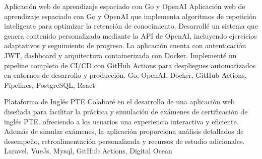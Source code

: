 %
%
%


\begin{projects}
	\project
	{Aplicación web de aprendizaje espaciado con Go y OpenAI }{}
	{Aplicación web de aprendizaje espaciado con Go y OpenAI que implementa algoritmos de repetición inteligente para optimizar la retención de conocimiento. Desarrollé un sistema que genera contenido personalizado mediante la API de OpenAI, incluyendo ejercicios adaptativos y seguimiento de progreso. La aplicación cuenta con autenticación JWT, dashboard y arquitectura containerizada con Docker. Implementé un pipeline completo de CI/CD con GitHub Actions para despliegues automatizados en entornos de desarrollo y producción.}
	{ Go, OpenAI, Docker, GitHub Actions, Pipelines, PostgreSQL, React}

	\project
	{Plataforma de Inglés PTE}{}
	{Colaboré en el desarrollo de una aplicación web diseñada para facilitar la práctica y simulación de exámenes de certificación de inglés PTE. ofreciendo a los usuarios una experiencia interactiva y eficiente. Además de simular exámenes, la aplicación proporciona análisis detallados de desempeño, retroalimentación personalizada y recursos de estudio adicionales.} 
	{Laravel, VueJs, Mysql, GitHub Actions, Digital Ocean}

\end{projects}